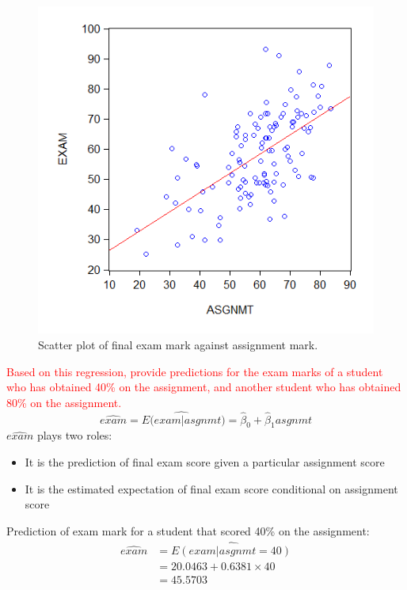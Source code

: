 \documentclass[12pt]{report}
\begin{document}
\vspace{-\baselineskip}
\begin{figure}[H]
	\centering
	\includegraphics{q1_21}
	\caption{Scatter plot of final exam mark against assignment mark.}
\end{figure}
\vspace{-\baselineskip}
\noindent \textcolor{red}
{
	Based on this regression, provide predictions for the exam marks of a student who has obtained 40\% on the assignment, and another student who has obtained 80\% on the assignment.
}
$$\widehat{exam} = \widehat{E(exam|asgnmt}) = \hat{\beta}_0 + \hat{\beta}_1 asgnmt$$
\noindent $\widehat{exam}$ plays two roles: 
\begin{itemize}
	\item It is the prediction of final exam score given a particular assignment score
	\item It is the estimated expectation of final exam score conditional on assignment score
\end{itemize}

\noindent Prediction of exam mark for a student that scored 40\% on the assignment:
\begin{align*}
	\widehat{exam} &= \widehat{E(exam|asgnmt = 40)} \\
	&= 20.0463 + 0.6381{\times}40 \\
	&= 45.5703
\end{align*}
\end{document}
